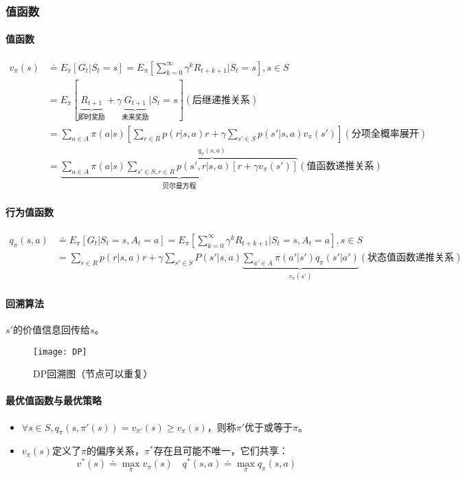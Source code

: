 \documentclass[
12pt, %
a4paper, 
oneside, %
headinclude,footinclude, %
]{scrartcl}
\begin{document}
\subsubsection[值函数]{值函数}
\paragraph{值函数}
\begin{align*}
v_\pi(s) &\doteq E_\pi[G_t|S_t = s] = E_\pi[\sum_{k = 0}^{\infty} \gamma^k R_{t + k + 1}|S_t = s], s \in S \\
&= E_\pi[\underbrace{R_{t + 1}}_{\text{即时奖励}} + \gamma \underbrace{G_{t + 1}}_{\text{未来奖励}}|S_t = s] (\text{后继递推关系}) \\
&= \sum_{a \in A} \pi(a|s)[\sum_{r \in R} p(r|s, a)r + \gamma \sum_{s' \in S} p(s'|s, a)v_{\pi}(s')] (\text{分项全概率展开}) \\
&= \underbrace{\sum_{a \in A} \pi(a|s) \overbrace{\sum_{s' \in S, r \in R} p(s', r|s, a)[r + \gamma v_\pi(s')]}^{q_{\pi}(s, a)}}_{\text{贝尔曼方程}} (\text{值函数递推关系})
\end{align*}
\paragraph{行为值函数}
\begin{align*} 
q_\pi(s, a) &\doteq E_\pi[G_t|S_t = s, A_t = a] = E_\pi[\sum_{k = 0}^{\infty} \gamma^k R_{t + k + 1}|S_t = s, A_t = a], s \in S \\
&= \sum_{r \in R} p(r|s, a)r + \gamma \sum_{s' \in S} P(s'|s, a) \underbrace{\sum_{a' \in A} \pi(a'|s')q_{\pi}(s'|a')}_{v_{\pi}(s')} (\text{状态值函数递推关系})
\end{align*}
\paragraph{回溯算法}
$ s' $的价值信息回传给$ s $。

\begin{figure}[H]
\centering 
\texttt{[image: DP]} 
\caption[DP回溯图]{DP回溯图（节点可以重复）}
\end{figure}
\paragraph{最优值函数与最优策略}
\begin{itemize}
\item $ \forall s \in S, q_{\pi}(s, \pi'(s)) = v_{\pi'}(s) \geq v_{\pi}(s) $，则称$ \pi' $优于或等于$ \pi $。
\item $ v_\pi(s) $定义了$ \pi $的偏序关系，$ \pi^* $存在且可能不唯一，它们共享：
$$ v^*(s) \doteq \max_{\pi} v_{\pi}(s) \quad q^*(s, a) \doteq \max_{\pi} q_{\pi}(s, a) $$
\end{itemize}
\end{document}
